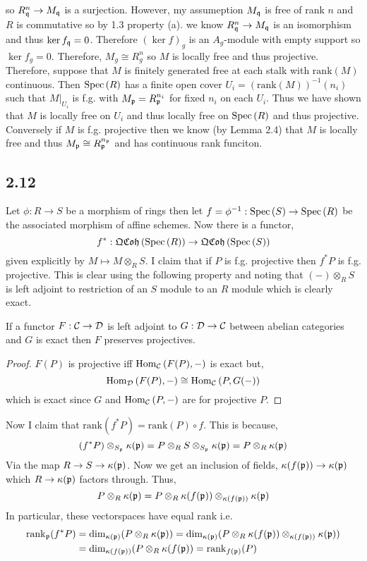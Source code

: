 \documentclass[12pt]{extarticle}
\newcommand{\rank}{\mathrm{rank}}
\begin{document}
so $R_{\mathfrak{q}}^n \to M_{\mathfrak{q}}$ is a surjection. However, my assumeption $M_{\mathfrak{q}}$ is free of rank $n$ and $R$ is commutative so by 1.3 property (a). we know $R_{\mathfrak{q}}^n \to M_{\mathfrak{q}}$ is an isomorphism and thus $\ker{f}_{\mathfrak{q}} = 0$. Therefore $(\ker{f})_g$ is an $A_g$-module with empty support so $\ker{f}_g = 0$. Therefore, $M_g \cong R_g^n$ so $M$ is locally free and thus projective.
\bigskip\\
Therefore, suppose that $M$ is finitely generated free at each stalk with $\rank(M)$ continuous. Then $\mathrm{Spec}\left( R \right)$ has a finite open cover $U_i = (\rank(M))^{-1}(n_i)$ such that $M|_{U_i}$ is f.g. with $M_{\mathfrak{p}} = R_{\mathfrak{p}}^{n_i}$ for fixed $n_i$ on each $U_i$. Thus we have shown that $M$ is locally free on $U_i$ and thus locally free on $\mathrm{Spec}\left( R \right)$ and thus projective. Conversely if $M$ is f.g. projective then we know (by Lemma 2.4) that $M$ is locally free and thus $M_{\mathfrak{p}} \cong R_{\mathfrak{p}}^{n_{\mathfrak{p}}}$ and has continuous rank funciton.   


\subsection{2.12}

Let $\phi : R \to S$ be a morphism of rings then let $f = \phi^{-1} : \mathrm{Spec}\left( S \right) \to \mathrm{Spec}\left( R \right)$ be the associated morphism of affine schemes. Now there is a functor,
\[ f^* : \mathfrak{QCoh}\left(\mathrm{Spec}\left( R \right)\right) \to \mathfrak{QCoh}\left(\mathrm{Spec}\left( S \right)\right) \] given explicitly by $M \mapsto M \otimes_R S$. I claim that if $P$ is f.g. projective then $f^* P$ is f.g. projective. This is clear using the following property and noting that $(-) \otimes_R S$ is left adjoint to restriction of an $S$ module to an $R$ module which is clearly exact.

\begin{lemma}
If a functor $F : \mathcal{C} \to \mathcal{D}$ is left adjoint to $G : \mathcal{D} \to \mathcal{C}$ between abelian categories and $G$ is exact then $F$ preserves projectives. 
\end{lemma}

\begin{proof}
$F(P)$ is projective iff $\mathrm{Hom}_{\mathcal{C}}\left( F(P) , - \right)$ is exact but,
\[ \mathrm{Hom}_{\mathcal{D}}\left( F(P) , - \right) \cong \mathrm{Hom}_{\mathcal{C}}\left( P , G(-) \right) \] which is exact since $G$ and $\mathrm{Hom}_{\mathcal{C}}\left( P , - \right)$ are for projective $P$. 
\end{proof}

Now I claim that $\rank(f^* P) = \rank(P) \circ f$. This is because,
\[ (f^* P) \otimes_{S_{\mathfrak{p}}} \kappa(\mathfrak{p}) = P \otimes_R S \otimes_{S_{\mathfrak{p}}} \kappa(\mathfrak{p}) = P \otimes_R \kappa(\mathfrak{p}) \]
Via the map $R \to S \to \kappa(\mathfrak{p})$. Now we get an inclusion of fields, $\kappa(f(\mathfrak{p})) \to \kappa(\mathfrak{p})$ which $R \to \kappa(\mathfrak{p})$ factors through. Thus,
\[ P \otimes_R \kappa(\mathfrak{p}) = P \otimes_R \kappa(f(\mathfrak{p})) \otimes_{\kappa(f(\mathfrak{p}))} \kappa(\mathfrak{p}) \]
In particular, these vectorspaces have equal rank i.e.
\begin{align*}
\rank_\p(f^* P) & = \dim_{\kappa(\p)} (P \otimes_R \kappa(\p)) = \dim_{\kappa(\p)} (P \otimes_R \kappa(f(\p)) \otimes_{\kappa(f(\p))} \kappa(\p)) 
\\
& = \dim_{\kappa(f(\p))} (P \otimes_R \kappa(f(\p)) = \rank_{f(\p)}(P) 
\end{align*}
\end{document}
